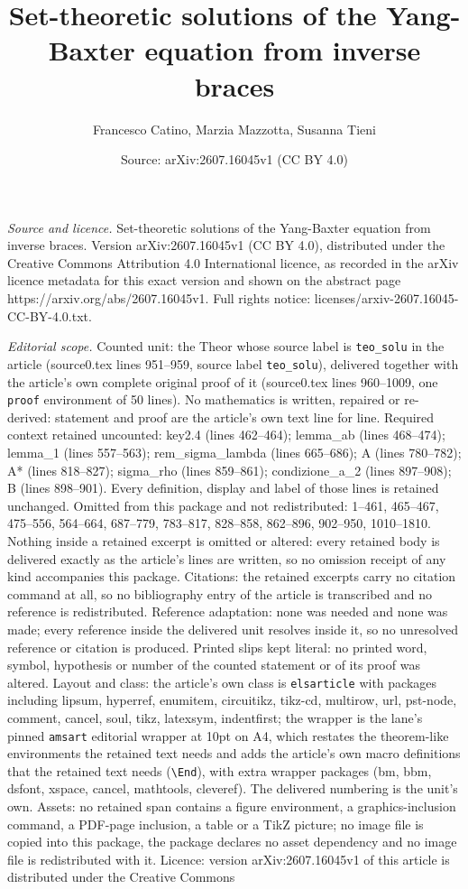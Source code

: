 \documentclass[10pt,a4paper]{amsart}
\title[Set-theoretic solutions of the Yang-Baxter equation from inv]{Set-theoretic solutions of the Yang-Baxter equation from inverse braces}
\author{Francesco Catino, Marzia Mazzotta, Susanna Tieni}
\date{Source: arXiv:2607.16045v1 (CC BY 4.0)}
\begin{document}
\maketitle

\noindent\emph{Source and licence.} Set-theoretic solutions of the Yang-Baxter equation from inverse braces. Version arXiv:2607.16045v1 (CC BY 4.0), distributed under the Creative Commons Attribution 4.0 International licence, as recorded in the arXiv licence metadata for this exact version and shown on the abstract page https://arxiv.org/abs/2607.16045v1. Full rights notice: licenses/arxiv-2607.16045-CC-BY-4.0.txt.\par\smallskip

\noindent\textit{Editorial scope.} Counted unit: the Theor whose source label is \texttt{teo\_solu} in the article (source0.tex lines 951--959, source label \texttt{teo\_solu}), delivered together with the article's own complete original proof of it (source0.tex lines 960--1009, one \texttt{proof} environment of 50 lines). No mathematics is written, repaired or re-derived: statement and proof are the article's own text line for line. Required context retained uncounted: key2.4 (lines 462--464); lemma\_ab (lines 468--474); lemma\_1 (lines 557--563); rem\_sigma\_lambda (lines 665--686); A (lines 780--782); A* (lines 818--827); sigma\_rho (lines 859--861); condizione\_a\_2 (lines 897--908); B (lines 898--901). Every definition, display and label of those lines is retained unchanged. Omitted from this package and not redistributed: 1--461, 465--467, 475--556, 564--664, 687--779, 783--817, 828--858, 862--896, 902--950, 1010--1810. Nothing inside a retained excerpt is omitted or altered: every retained body is delivered exactly as the article's lines are written, so no omission receipt of any kind accompanies this package. Citations: the retained excerpts carry no citation command at all, so no bibliography entry of the article is transcribed and no reference is redistributed. Reference adaptation: none was needed and none was made; every reference inside the delivered unit resolves inside it, so no unresolved reference or citation is produced. Printed slips kept literal: no printed word, symbol, hypothesis or number of the counted statement or of its proof was altered. Layout and class: the article's own class is \texttt{elsarticle} with packages including lipsum, hyperref, enumitem, circuitikz, tikz-cd, multirow, url, pst-node, comment, cancel, soul, tikz, latexsym, indentfirst; the wrapper is the lane's pinned \texttt{amsart} editorial wrapper at 10pt on A4, which restates the theorem-like environments the retained text needs and adds the article's own macro definitions that the retained text needs (\texttt{\textbackslash End}), with extra wrapper packages (bm, bbm, dsfont, xspace, cancel, mathtools, cleveref). The delivered numbering is the unit's own. Assets: no retained span contains a figure environment, a graphics-inclusion command, a PDF-page inclusion, a table or a TikZ picture; no image file is copied into this package, the package declares no asset dependency and no image file is redistributed with it. Licence: version arXiv:2607.16045v1 of this article is distributed under the Creative Commons 
\end{document}
